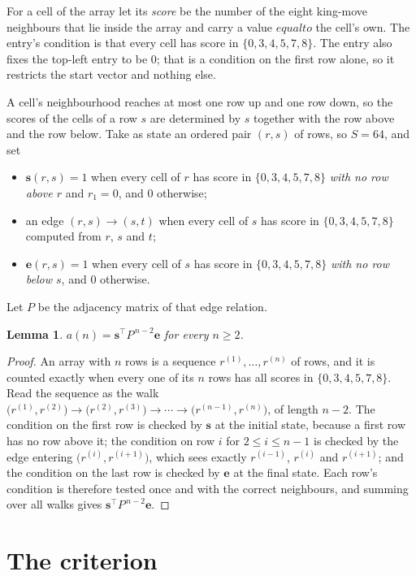 \documentclass[11pt,a4paper]{article}
\theoremstyle{plain}
\newtheorem{lemma}[theorem]{Lemma}
\theoremstyle{definition}
\begin{document}
For a cell of the array let its \emph{score} be the number of the eight king-move neighbours that lie inside
the array and carry a value $equal to$ the cell's own. The entry's condition is that every cell
has score in $\{0,3,4,5,7,8\}$. The entry also fixes the top-left entry to be $0$; that is a condition on the first row alone, so it restricts the start vector and nothing else.

A cell's neighbourhood reaches at most one row up and one row down, so the scores of the
cells of a row $s$ are determined by $s$ together with the row above and the row below.
Take as state an ordered pair $(r,s)$ of rows, so $S=64$, and set
\begin{itemize}
\item $\mathbf{s}(r,s)=1$ when every cell of $r$ has score in $\{0,3,4,5,7,8\}$ \emph{with no row
above $r$} and $r_1=0$, and $0$ otherwise;
\item an edge $(r,s)\to(s,t)$ when every cell of $s$ has score in $\{0,3,4,5,7,8\}$ computed from
$r$, $s$ and $t$;
\item $\mathbf{e}(r,s)=1$ when every cell of $s$ has score in $\{0,3,4,5,7,8\}$ \emph{with no row
below $s$}, and $0$ otherwise.
\end{itemize}
Let $P$ be the adjacency matrix of that edge relation.

\begin{lemma}\label{lem:walk}
$a(n)=\mathbf{s}^{\!\top}P^{\,n-2}\mathbf{e}$ for every $n\ge2$.
\end{lemma}

\begin{proof}
An array with $n$ rows is a sequence $r^{(1)},\dots,r^{(n)}$ of rows, and it is counted
exactly when every one of its $n$ rows has all scores in $\{0,3,4,5,7,8\}$. Read the sequence as the
walk $\bigl(r^{(1)},r^{(2)}\bigr)\to\bigl(r^{(2)},r^{(3)}\bigr)\to\cdots\to
\bigl(r^{(n-1)},r^{(n)}\bigr)$, of length $n-2$. The condition on the first row is
checked by $\mathbf{s}$ at the initial state, because a first row has no row above it; the
condition on row $i$ for $2\le i\le n-1$ is checked by the edge entering
$\bigl(r^{(i)},r^{(i+1)}\bigr)$, which sees exactly $r^{(i-1)}$, $r^{(i)}$ and
$r^{(i+1)}$; and the condition on the last row is checked by $\mathbf{e}$ at the final
state. Each row's condition is therefore tested once and with the correct neighbours, and
summing over all walks gives $\mathbf{s}^{\!\top}P^{\,n-2}\mathbf{e}$.
\end{proof}

\section{The criterion}
\end{document}
